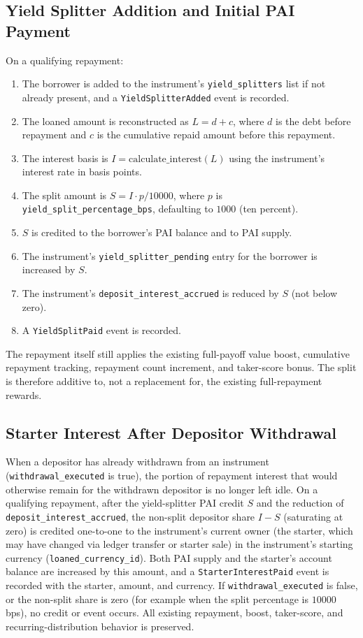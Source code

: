 \documentclass[11pt,a4paper]{article}
\begin{document}
\subsection{Yield Splitter Addition and Initial PAI Payment}
On a qualifying repayment:
\begin{enumerate}
\item The borrower is added to the instrument's \texttt{yield\_splitters} list if not already present, and a \texttt{YieldSplitterAdded} event is recorded.
\item The loaned amount is reconstructed as $L = d + c$, where $d$ is the debt before repayment and $c$ is the cumulative repaid amount before this repayment.
\item The interest basis is $I = \mathrm{calculate\_interest}(L)$ using the instrument's interest rate in basis points.
\item The split amount is $S = I \cdot p / 10000$, where $p$ is \texttt{yield\_split\_percentage\_bps}, defaulting to $1000$ (ten percent).
\item $S$ is credited to the borrower's PAI balance and to PAI supply.
\item The instrument's \texttt{yield\_splitter\_pending} entry for the borrower is increased by $S$.
\item The instrument's \texttt{deposit\_interest\_accrued} is reduced by $S$ (not below zero).
\item A \texttt{YieldSplitPaid} event is recorded.
\end{enumerate}
The repayment itself still applies the existing full-payoff value boost, cumulative repayment tracking, repayment count increment, and taker-score bonus. The split is therefore additive to, not a replacement for, the existing full-repayment rewards.

\subsection{Starter Interest After Depositor Withdrawal}
When a depositor has already withdrawn from an instrument (\texttt{withdrawal\_executed} is true), the portion of repayment interest that would otherwise remain for the withdrawn depositor is no longer left idle. On a qualifying repayment, after the yield-splitter PAI credit $S$ and the reduction of \texttt{deposit\_interest\_accrued}, the non-split depositor share $I - S$ (saturating at zero) is credited one-to-one to the instrument's current owner (the starter, which may have changed via ledger transfer or starter sale) in the instrument's starting currency (\texttt{loaned\_currency\_id}). Both PAI supply and the starter's account balance are increased by this amount, and a \texttt{StarterInterestPaid} event is recorded with the starter, amount, and currency. If \texttt{withdrawal\_executed} is false, or the non-split share is zero (for example when the split percentage is $10000$ bps), no credit or event occurs. All existing repayment, boost, taker-score, and recurring-distribution behavior is preserved.
\end{document}
